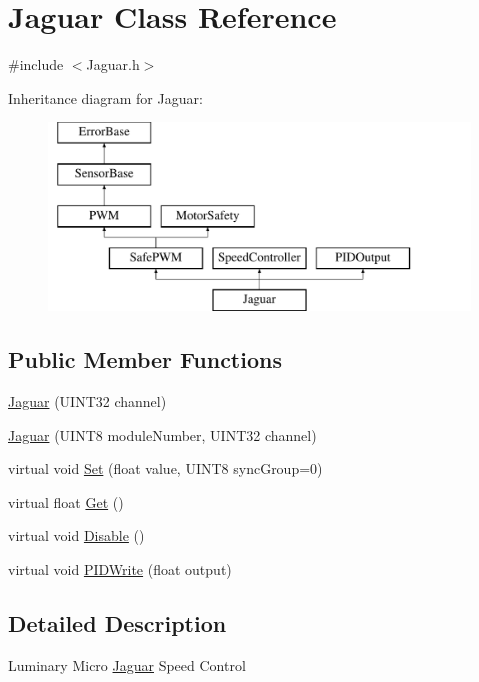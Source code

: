 \hypertarget{classJaguar}{
\section{Jaguar Class Reference}
\label{classJaguar}
}


{\ttfamily \#include $<$Jaguar.h$>$}

Inheritance diagram for Jaguar:\begin{figure}[H]
\begin{center}
\leavevmode
\includegraphics[height=5.000000cm]{classJaguar}
\end{center}
\end{figure}
\subsection*{Public Member Functions}
\begin{DoxyCompactItemize}
\item 
\hyperlink{classJaguar_ac209b4c1dfe97eacb264889f53b523a4}{Jaguar} (UINT32 channel)
\item 
\hyperlink{classJaguar_a84a9cebc7f34fd312309d4bb6812ce33}{Jaguar} (UINT8 moduleNumber, UINT32 channel)
\item 
virtual void \hyperlink{classJaguar_a1a15089e9ea94102f1d003bce3ae2f54}{Set} (float value, UINT8 syncGroup=0)
\item 
virtual float \hyperlink{classJaguar_a7ce9aa9378ec4f0907dca524f63bfdd1}{Get} ()
\item 
virtual void \hyperlink{classJaguar_a59b1a6772a482f810134a4c623416b44}{Disable} ()
\item 
virtual void \hyperlink{classJaguar_af03d1c5b19cae7363d9eafdcb9ec354e}{PIDWrite} (float output)
\end{DoxyCompactItemize}


\subsection{Detailed Description}
Luminary Micro \hyperlink{classJaguar}{Jaguar} Speed Control 

